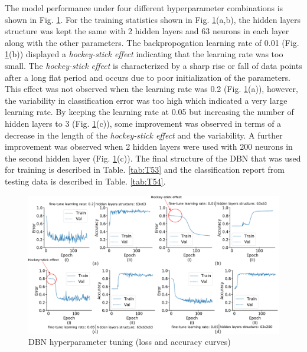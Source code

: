 \documentclass[preprint,review,12pt]{elsarticle}
\begin{document}
The model performance under four different hyperparameter combinations is shown in Fig. \ref{fig:fig58}. For the training statistics shown in Fig. \ref{fig:fig58}(a,b), the hidden layers structure was kept the same with 2 hidden layers and 63 neurons in each layer along with the other parameters. The backpropogation learning rate of 0.01 (Fig. \ref{fig:fig58}(b)) displayed a \emph{hockey-stick effect} indicating that the learning rate was too small. The \emph{hockey-stick effect} is characterized by a sharp rise or fall of data points after a long flat period and occurs due to poor initialization of the parameters. This effect was not observed when the learning rate was 0.2 (Fig. \ref{fig:fig58}(a)), however, the variability in classification error was too high which indicated a very large learning rate. By keeping the learning rate at 0.05 but increasing the number of hidden layers to 3 (Fig. \ref{fig:fig58}(c)), some improvement was observed in terms of a decrease in the length of the \emph{hockey-stick effect} and the variability. A further improvement was observed when 2 hidden layers were used with 200 neurons in the second hidden layer (Fig. \ref{fig:fig58}(c)). The final structure of the DBN that was used for training is described in Table. \ref{tab:T53} and the classification report from testing data is described in Table. \ref{tab:T54}. \par

\begin{figure}[!h]
  \begin{center}
    \includegraphics[width=\linewidth]{58.png}
    \caption{DBN hyperparameter tuning (loss and accuracy curves)}\label{fig:fig58}
  \end{center}
\end{figure}
\end{document}
